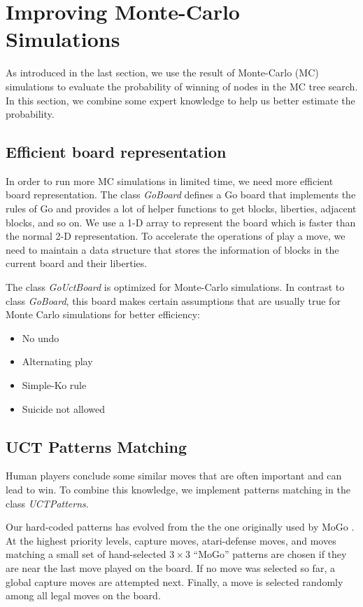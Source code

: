 
\section{Improving Monte-Carlo Simulations}

As introduced in the last section, we use the result of Monte-Carlo (MC) simulations to evaluate the probability of winning of nodes in the MC tree search. In this section, we combine some expert knowledge to help us better estimate the probability.

\subsection{Efficient board representation}

In order to run more MC simulations in limited time, we need more efficient board representation. The class \emph{GoBoard} defines a Go board that implements the rules of Go and provides a lot of helper functions to get blocks, liberties, adjacent blocks, and so on. We use a 1-D array to represent the board which is faster than the normal 2-D representation. To accelerate the operations of play a move, we need to maintain a data structure that stores the information of blocks in the current board and their liberties.

The class \emph{GoUctBoard} is optimized for Monte-Carlo simulations. In contrast to class \emph{GoBoard}, this board makes certain assumptions that are usually true for Monte Carlo simulations for better efficiency:
\begin{itemize}
  \item No undo
  \item Alternating play
  \item Simple-Ko rule
  \item Suicide not allowed
\end{itemize}

\subsection{UCT Patterns Matching}

Human players conclude some similar moves that are often important and can lead to win. To combine this knowledge, we implement patterns matching in the class \emph{UCTPatterns}.

Our hard-coded patterns has evolved from the the one originally used by MoGo \cite{gelly2007contribution}. At the highest priority levels, capture moves, atari-defense moves, and moves matching a small set of hand-selected $3 \times 3$ ``MoGo'' patterns are chosen if they are near the last move played on the board. If no move was selected so far, a global capture moves are attempted next. Finally, a move is selected randomly among all legal moves on the board.

